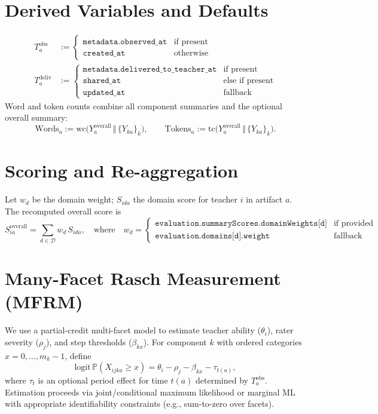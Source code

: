 \documentclass[11pt]{article}
\newcommand{\logit}{\mathrm{logit}}
\newcommand{\Prob}{\mathbb{P}}
\begin{document}
\section{Derived Variables and Defaults}
\begin{align*}
T^{\mathrm{obs}}_a &:= 
\begin{cases}
\texttt{metadata.observed\_at} & \text{if present}\\
\texttt{created\_at} & \text{otherwise}
\end{cases}\\[4pt]
T^{\mathrm{deliv}}_a &:= 
\begin{cases}
\texttt{metadata.delivered\_to\_teacher\_at} & \text{if present}\\
\texttt{shared\_at} & \text{else if present}\\
\texttt{updated\_at} & \text{fallback}
\end{cases}
\end{align*}
\noindent
Word and token counts combine all component summaries and the optional overall summary:
\[
\text{Words}_a := \mathrm{wc}\bigl(Y^{\mathrm{overall}}_a \,\Vert\, \{Y_{k a}\}_k\bigr), \qquad
\text{Tokens}_a := \mathrm{tc}\bigl(Y^{\mathrm{overall}}_a \,\Vert\, \{Y_{k a}\}_k\bigr).
\]

\section{Scoring and Re-aggregation}
Let $w_d$ be the domain weight; $S_{i d a}$ the domain score for teacher $i$ in artifact $a$. The recomputed overall score is
\begin{equation}
S^{\mathrm{overall}}_{i a} = \sum_{d \in \mathcal{D}} w_d \, S_{i d a}, 
\quad\text{where}\quad w_d =
\begin{cases}
\texttt{evaluation.summaryScores.domainWeights[d]} & \text{if provided}\\
\texttt{evaluation.domains[d].weight} & \text{fallback}
\end{cases}
\end{equation}

\section{Many-Facet Rasch Measurement (MFRM)}
We use a partial-credit multi-facet model to estimate teacher ability ($\theta_i$), rater severity ($\rho_j$), and step thresholds ($\beta_{k x}$). For component $k$ with ordered categories $x=0,\dots,m_k-1$, define
\begin{equation}
\logit\, \Prob(X_{i j k a} \ge x) 
= \theta_i - \rho_j - \beta_{k x} - \tau_{t(a)} ,
\label{eq:mfrm}
\end{equation}
where $\tau_{t}$ is an optional period effect for time $t(a)$ determined by $T^{\mathrm{obs}}_a$. Estimation proceeds via joint/conditional maximum likelihood or marginal ML with appropriate identifiability constraints (e.g., sum-to-zero over facets).
\end{document}
